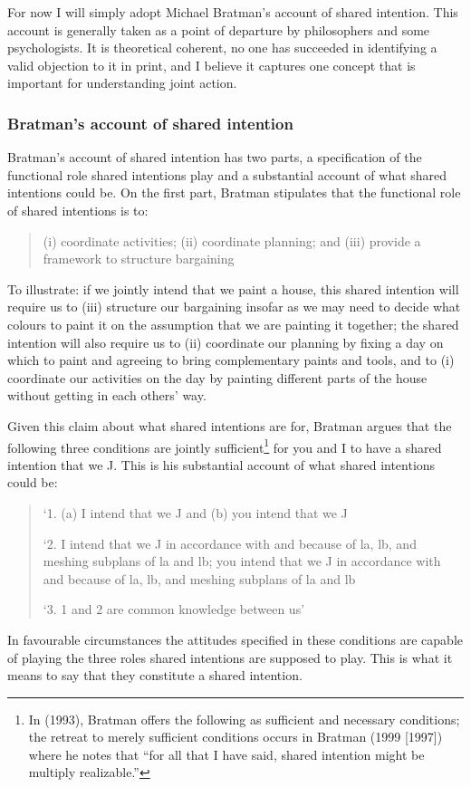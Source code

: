 \documentclass[14pt,a4paper]{extarticle}
\begin{document}
For now I will simply adopt Michael Bratman's account of shared intention.  
This account is generally taken as a point of departure by philosophers and some psychologists.
It is theoretical coherent, 
no one has succeeded in identifying a valid objection to it in print, 
and I believe it captures one concept that is important for understanding joint action.

\subsubsection{Bratman's account of shared intention}

Bratman's account of shared intention has two parts, a specification of the functional role shared intentions play and a substantial account of what shared intentions could be.  On the first part, Bratman stipulates that the functional role of shared intentions is to: 
%
\begin{quote}
(i) coordinate activities; (ii) coordinate planning; and (iii) provide a framework to structure bargaining \citep[p.\ 99]{Bratman:1993je}
\end{quote}
%
To illustrate: if we jointly intend that we paint a house, this shared intention will require us to (iii) structure our bargaining insofar as we may need to decide what colours to paint it on the assumption that we are painting it together; the shared intention will also require us to (ii) coordinate our planning by fixing a day on which to paint and agreeing to bring complementary paints and tools, and to (i) coordinate our activities on the day by painting different parts of the house without getting in each others’ way.

Given this claim about what shared intentions are for, Bratman argues that the following three conditions are jointly sufficient\footnote{
In (1993), Bratman offers the following as sufficient and necessary conditions; the retreat to merely sufficient conditions occurs in Bratman (1999 [1997]) where he notes that “for all that I have said, shared intention might be multiply realizable.”
}  
for you and I to have a shared intention that we J.  This is his substantial account of what shared intentions could be:
%
\begin{quote}
`1. (a) I intend that we J and (b) you intend that we J

`2. I intend that we J in accordance with and because of la, lb, and meshing subplans of la and lb; you intend that we J in accordance with and because of la, lb, and meshing subplans of la and lb

`3. 1 and 2 are common knowledge between us' \citep[View 4]{Bratman:1993je}
\end{quote}
%
In favourable circumstances the attitudes specified in these conditions are capable of playing the three roles shared intentions are supposed to play.  This is what it means to say that they constitute a shared intention.
\end{document}
